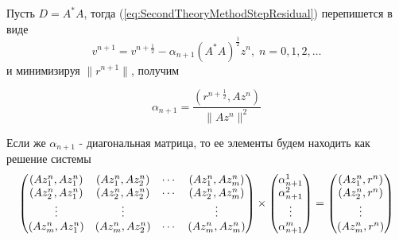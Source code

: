 Пусть $D=A^*A$, тогда (\ref{eq:SecondTheoryMethodStepResidual}) перепишется в виде
\begin{equation}
    \label{eq:SecondTheoryMethodStepResidual2}
    v^{n+1}=v^{n+\frac{1}{2}}-\alpha_{n+1}(A^*A)^{\frac{1}{2}}z^n,\;n=0,1,2,\ldots
\end{equation}
и минимизируя $\|r^{n+1}\|$, получим

\begin{equation}
    \label{eq:TheoryMethodAlpha2}
    \alpha_{n+1}=\frac{(r^{n+\frac{1}{2}},Az^n)}{\|Az^n\|^2}
\end{equation}

Если же $\alpha_{n+1}$ - диагональная матрица, то ее элементы будем находить как решение системы
\begin{equation}
    \label{eq:TheoryMethodAlpha3}
    \begin{pmatrix}
	(Az^n_1,Az^n_1) & (Az^n_1,Az^n_2) & \cdots & (Az^n_1,Az^n_m)\\
	(Az^n_2,Az^n_1) & (Az^n_2,Az^n_2) & \cdots & (Az^n_2,Az^n_m)\\
	\vdots & \vdots & & \vdots\\
	(Az^n_m,Az^n_1) & (Az^n_m,Az^n_2) & \cdots & (Az^n_m,Az^n_m)\\
    \end{pmatrix}
    \times
    \begin{pmatrix}
	\alpha^1_{n+1}\\
	\alpha^2_{n+1}\\
	\vdots\\
	\alpha^m_{n+1}\\
    \end{pmatrix}
    =
    \begin{pmatrix}
	(Az^n_1,r^n)\\
	(Az^n_2,r^n)\\
	\vdots\\
	(Az^n_m,r^n)\\
    \end{pmatrix}\notag
\end{equation}
